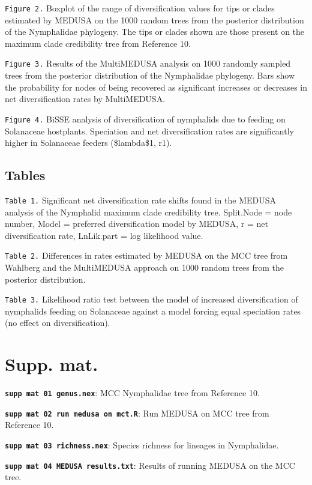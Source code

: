 \documentclass[10pt]{article}
\begin{document}
\texttt{Figure 2.} Boxplot of the range of diversification values for
tips or clades estimated by MEDUSA on the 1000 random trees from the
posterior distribution of the Nymphalidae phylogeny. The tips or clades
shown are those present on the maximum clade credibility tree from
Reference 10.

\texttt{Figure 3.} Results of the MultiMEDUSA analysis on 1000 randomly
sampled trees from the posterior distribution of the Nymphalidae
phylogeny. Bars show the probability for nodes of being recovered as
significant increases or decreases in net diversification rates by
MultiMEDUSA.

\texttt{Figure 4.} BiSSE analysis of diversification of nymphalids due
to feeding on Solanaceae hostplants. Speciation and net diversification
rates are significantly higher in Solanaceae feeders (\$lambda\$1, r1).

\subsection*{Tables}\label{tables}

\texttt{Table 1.} Significant net diversification rate shifts found in
the MEDUSA analysis of the Nymphalid maximum clade credibility tree.
Split.Node = node number, Model = preferred diversification model by
MEDUSA, r = net diversification rate, LnLik.part = log likelihood value.

\texttt{Table 2.} Differences in rates estimated by MEDUSA on the MCC
tree from Wahlberg and the MultiMEDUSA approach on 1000 random trees
from the posterior distribution.

\texttt{Table 3.} Likelihood ratio test between the model of increased
diversification of nymphalids feeding on Solanaceae against a model
forcing equal speciation rates (no effect on diversification).

\section*{Supp. mat.}\label{supp.-mat.}

\textbf{\texttt{supp mat 01 genus.nex}}: MCC Nymphalidae tree from
Reference 10.

\textbf{\texttt{supp mat 02 run medusa on mct.R}}: Run MEDUSA on
MCC tree from Reference 10.

\textbf{\texttt{supp mat 03 richness.nex}}: Species richness for
lineages in Nymphalidae.

\textbf{\texttt{supp mat 04 MEDUSA results.txt}}: Results of running
MEDUSA on the MCC tree.
\end{document}
